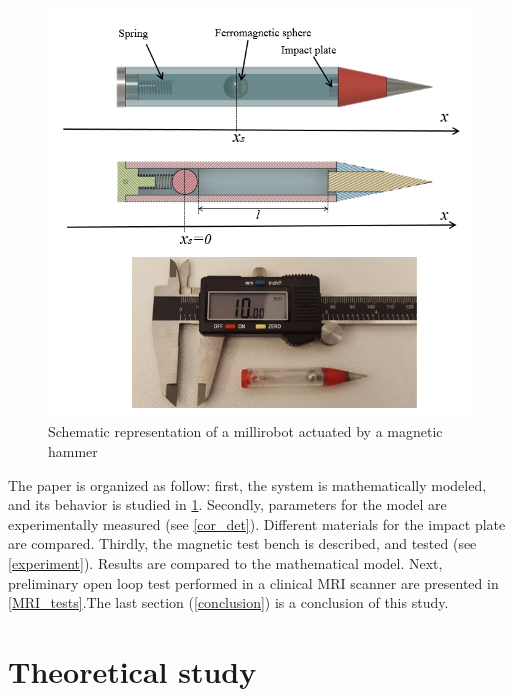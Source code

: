 \documentclass[letterpaper, 10 pt, conference]{ieeeconf}  %
\begin{document}
\begin{figure}
  \includegraphics[width=\linewidth]{figure1-2.png}
  \caption{Schematic representation of a millirobot actuated by a magnetic hammer}
  \label{millirobot}
\end{figure}

The paper is organized as follow: first, the system is mathematically modeled, and its behavior is studied in \cref{theoretical}. Secondly, parameters for the model are experimentally measured (see \cref{cor_det}). Different materials for the impact plate are compared. Thirdly, the magnetic test bench is described, and tested (see \cref{experiment}). Results are compared to the mathematical model. Next, preliminary open loop test performed in a clinical MRI scanner are presented in \cref{MRI_tests}.The last section (\cref{conclusion}) is a conclusion of this study.


\section{Theoretical study}
\label{theoretical}
\end{document}
